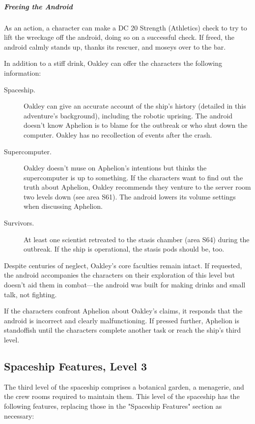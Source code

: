\documentclass[10pt,a4paper,twoside,bg=print,twocolumn,openany,nodeprecatedcode]{dndbook}
\begin{document}
\subparagraph{Freeing the Android}
As an action, a character can make a DC 20 Strength (Athletics) check to try to lift the wreckage off the android, doing so on a successful check. If freed, the android calmly stands up, thanks its rescuer, and moseys over to the bar.

In addition to a stiff drink, Oakley can offer the characters the following information:


\begin{description}
\item[Spaceship.]
Oakley can give an accurate account of the ship's history (detailed in this adventure's background), including the robotic uprising. The android doesn't know Aphelion is to blame for the outbreak or who shut down the computer. Oakley has no recollection of events after the crash.
\item[Supercomputer.]
Oakley doesn't muse on Aphelion's intentions but thinks the supercomputer is up to something. If the characters want to find out the truth about Aphelion, Oakley recommends they venture to the server room two levels down (see area S61). The android lowers its volume settings when discussing Aphelion.
\item[Survivors.]
At least one scientist retreated to the stasis chamber (area S64) during the outbreak. If the ship is operational, the stasis pods should be, too.
\end{description}

Despite centuries of neglect, Oakley's core faculties remain intact. If requested, the android accompanies the characters on their exploration of this level but doesn't aid them in combat—the android was built for making drinks and small talk, not fighting.

If the characters confront Aphelion about Oakley's claims, it responds that the android is incorrect and clearly malfunctioning. If pressed further, Aphelion is standoffish until the characters complete another task or reach the ship's third level.

\subsection{Spaceship Features, Level 3}
The third level of the spaceship comprises a botanical garden, a menagerie, and the crew rooms required to maintain them. This level of the spaceship has the following features, replacing those in the "Spaceship Features" section as necessary:
\end{document}
